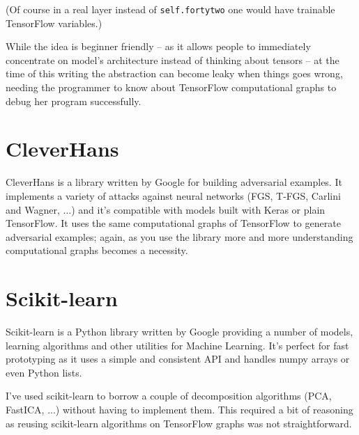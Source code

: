 (Of course in a real layer instead of \texttt{self.fortytwo} one would
have trainable TensorFlow variables.)

While the idea is beginner friendly -- as it allows people to
immediately concentrate on model's architecture instead of thinking
about tensors -- at the time of this writing the abstraction can become
leaky when things goes wrong, needing the programmer to know about
TensorFlow computational graphs to debug her program successfully.

\section{CleverHans}
\label{sec:cleverhans}

CleverHans is a library written by Google for building adversarial
examples. It implements a variety of attacks against neural networks
(FGS, T-FGS, Carlini and Wagner, ...) and it's compatible with models
built with Keras or plain TensorFlow. It uses the same computational
graphs of TensorFlow to generate adversarial examples; again, as you
use the library more and more understanding computational graphs
becomes a necessity.

\section{Scikit-learn}
\label{sec:sklearn}

Scikit-learn is a Python library written by Google providing a number
of models, learning algorithms and other utilities for Machine
Learning. It's perfect for fast prototyping as it uses a simple and
consistent API and handles numpy arrays or even Python lists.

I've used scikit-learn to borrow a couple of decomposition algorithms
(PCA, FastICA, ...) without having to implement them. This required a
bit of reasoning as reusing scikit-learn algorithms on TensorFlow
graphs was not straightforward.
